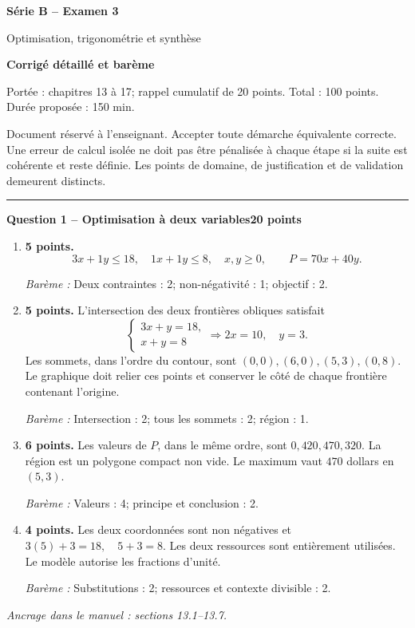 \documentclass[11pt,a4paper]{article}
\begin{document}
{\LARGE\bfseries Série B -- Examen 3}\par
{\large Optimisation, trigonométrie et synthèse}\par
\textbf{Corrigé détaillé et barème}\par
Portée : chapitres 13 à 17; rappel cumulatif de 20 points. Total : 100 points. Durée proposée : 150 min.\par
\small Document réservé à l’enseignant. Accepter toute démarche équivalente correcte. Une erreur de calcul isolée ne doit pas être pénalisée à chaque étape si la suite est cohérente et reste définie. Les points de domaine, de justification et de validation demeurent distincts.\normalsize\par
\vspace{3mm}\hrule\vspace{4mm}
{\large\bfseries Question 1 -- Optimisation à deux variables}\hfill\textbf{20 points}\par
\begin{enumerate}
\item \textbf{5 points.} \[3x+1y\le 18,\quad 1x+1y\le 8,\quad x,y\ge0,\qquad P=70x+40y.\]
\par{\small\textit{Barème : }Deux contraintes : 2; non-négativité : 1; objectif : 2.}
\item \textbf{5 points.} L’intersection des deux frontières obliques satisfait \[\begin{cases}3x+y=18,\\x+y=8\end{cases}\Longrightarrow2x=10,\quad y=3.\] Les sommets, dans l’ordre du contour, sont \((0,0),(6,0),(5,3),(0,8)\). Le graphique doit relier ces points et conserver le côté de chaque frontière contenant l’origine.
\par{\small\textit{Barème : }Intersection : 2; tous les sommets : 2; région : 1.}
\item \textbf{6 points.} Les valeurs de \(P\), dans le même ordre, sont \(0,420,470,320\). La région est un polygone compact non vide. Le maximum vaut \(470\) dollars en \((5,3)\).
\par{\small\textit{Barème : }Valeurs : 4; principe et conclusion : 2.}
\item \textbf{4 points.} Les deux coordonnées sont non négatives et \(3(5)+3=18,\quad5+3=8\). Les deux ressources sont entièrement utilisées. Le modèle autorise les fractions d’unité.
\par{\small\textit{Barème : }Substitutions : 2; ressources et contexte divisible : 2.}
\end{enumerate}
\vfill {\small\textit{Ancrage dans le manuel : sections 13.1--13.7.}}
\end{document}
